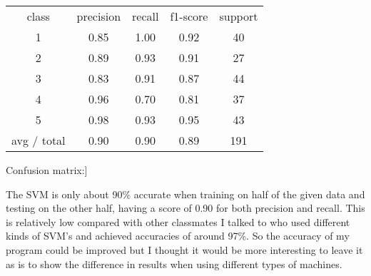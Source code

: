 \begin{center}
\begin{tabular}{ c c c c c }
class & precision &  recall & f1-score & support \\
1 & 0.85 & 1.00 & 0.92 & 40 \\
2 & 0.89 & 0.93 & 0.91 & 27 \\
3 & 0.83 & 0.91 & 0.87 & 44 \\
4 & 0.96 & 0.70 & 0.81 & 37 \\
5 & 0.98 & 0.93 & 0.95 & 43 \\
avg / total & 0.90 & 0.90 & 0.89 & 191
\end{tabular}
\newline

Confusion matrix:\newline
[[40  0  0  0  0]\newline
 [ 0 25  0  1  1]\newline
 [ 3  1 40  0  0]\newline
 [ 4  0  7 26  0]\newline
 [ 0  2  1  0 40]]\newline
\end{center}
\newline

The SVM is only about 90\% accurate when training on half of the given data and testing on the other half, having a score of 0.90 for both precision and recall. This is relatively low compared with other classmates I talked to who used different kinds of SVM's and achieved accuracies of around 97\%. So the accuracy of my program could be improved but I thought it would be more interesting to leave it as is to show the difference in results when using different types of machines.


